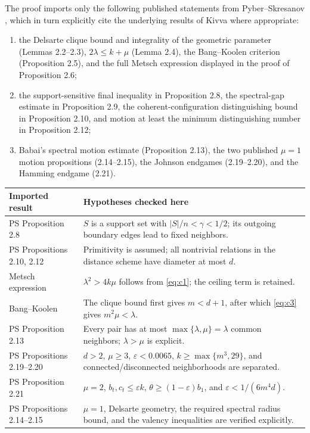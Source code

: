 \documentclass[11pt]{amsart}
\theoremstyle{definition}
\newcommand{\eps}{\varepsilon}
\newcommand{\gam}{\gamma}
\begin{document}
The proof imports only the following published statements from Pyber--Skresanov \cite{PS}, which in turn explicitly cite the underlying results of Kivva where appropriate:
\begin{enumerate}[leftmargin=2.2em,itemsep=0.3em]
\item the Delsarte clique bound and integrality of the geometric parameter (Lemmas 2.2--2.3), $2\lambda\le k+\mu$ (Lemma 2.4), the Bang--Koolen criterion (Proposition 2.5), and the full Metsch expression displayed in the proof of Proposition 2.6;
\item the support-sensitive final inequality in Proposition 2.8, the spectral-gap estimate in Proposition 2.9, the coherent-configuration distinguishing bound in Proposition 2.10, and motion at least the minimum distinguishing number in Proposition 2.12;
\item Babai's spectral motion estimate (Proposition 2.13), the two published $\mu=1$ motion propositions (2.14--2.15), the Johnson endgames (2.19--2.20), and the Hamming endgame (2.21).
\end{enumerate}

\begin{center}
\small
\begin{tabular}{@{}>{\raggedright\arraybackslash}p{}p{}@{}}
\toprule
Imported result & Hypotheses checked here \\
\midrule
PS Proposition 2.8 & $S$ is a support set with $|S|/n<\gam<1/2$; its outgoing boundary edges lead to fixed neighbors. \\
PS Propositions 2.10, 2.12 & Primitivity is assumed; all nontrivial relations in the distance scheme have diameter at most $d$. \\
Metsch expression & $\lambda^2>4k\mu$ follows from \eqref{eq:c1}; the ceiling term is retained. \\
Bang--Koolen & The clique bound first gives $m<d+1$, after which \eqref{eq:c3} gives $m^2\mu<\lambda$. \\
PS Proposition 2.13 & Every pair has at most $\max\{\lambda,\mu\}=\lambda$ common neighbors; $\lambda>\mu$ is explicit. \\
PS Propositions 2.19--2.20 & $d>2$, $\mu\ge3$, $\eps<0.0065$, $k\ge\max\{m^3,29\}$, and connected/disconnected neighborhoods are separated. \\
PS Proposition 2.21 & $\mu=2$, $b_t,c_t\le\eps k$, $\theta\ge(1-\eps)b_1$, and $\eps<1/(6m^4d)$. \\
PS Propositions 2.14--2.15 & $\mu=1$, Delsarte geometry, the required spectral radius bound, and the valency inequalities are verified explicitly. \\
\bottomrule
\end{tabular}
\end{center}
\end{document}
